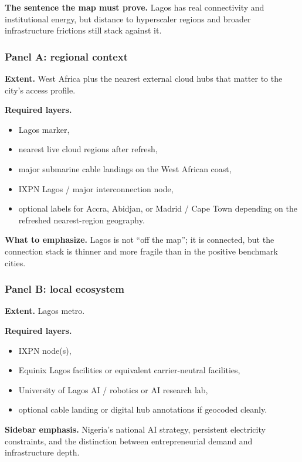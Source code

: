 \documentclass[11pt]{article}
\begin{document}
\textbf{The sentence the map must prove.} Lagos has real connectivity and institutional energy, but distance to hyperscaler regions and broader infrastructure frictions still stack against it.

\subsubsection*{Panel A: regional context}
\textbf{Extent.} West Africa plus the nearest external cloud hubs that matter to the city's access profile.

\textbf{Required layers.}
\begin{itemize}[leftmargin=1.4em,itemsep=0.18em]
    \item Lagos marker,
    \item nearest live cloud regions after refresh,
    \item major submarine cable landings on the West African coast,
    \item IXPN Lagos / major interconnection node,
    \item optional labels for Accra, Abidjan, or Madrid / Cape Town depending on the refreshed nearest-region geography.
\end{itemize}

\textbf{What to emphasize.} Lagos is not ``off the map''; it is connected, but the connection stack is thinner and more fragile than in the positive benchmark cities.

\subsubsection*{Panel B: local ecosystem}
\textbf{Extent.} Lagos metro.

\textbf{Required layers.}
\begin{itemize}[leftmargin=1.4em,itemsep=0.18em]
    \item IXPN node(s),
    \item Equinix Lagos facilities or equivalent carrier-neutral facilities,
    \item University of Lagos AI / robotics or AI research lab,
    \item optional cable landing or digital hub annotations if geocoded cleanly.
\end{itemize}

\textbf{Sidebar emphasis.} Nigeria's national AI strategy, persistent electricity constraints, and the distinction between entrepreneurial demand and infrastructure depth.
\end{document}
